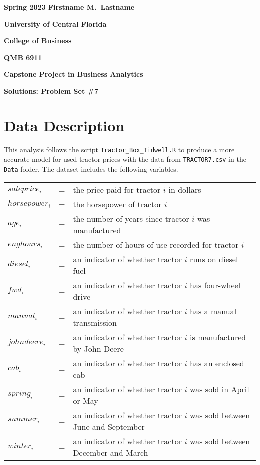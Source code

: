 \documentclass[11pt]{paper}
\begin{document}

\pagestyle{empty}
{\noindent\bf Spring 2023 \hfill Firstname M.~Lastname}
\vskip 16pt
\centerline{\bf University of Central Florida}
\centerline{\bf College of Business}
\vskip 16pt
\centerline{\bf QMB 6911}
\centerline{\bf Capstone Project in Business Analytics}
\vskip 10pt
\centerline{\bf Solutions:  Problem Set \#7}
\vskip 32pt
\noindent
% 
\section{Data Description}

This analysis follows the script \texttt{Tractor\_Box\_Tidwell.R} to produce a more accurate model for used tractor prices with the data from \texttt{TRACTOR7.csv} in the \texttt{Data} folder. 
The dataset includes the following variables.
\begin{table}[h!]
\begin{tabular}{l l l}

$saleprice_i$ & = & the price paid for tractor $i$ in dollars \\
% 
$horsepower_i$ & = & the horsepower of tractor $i$ \\
$age_i$ & = & the number of years since tractor $i$ was manufactured  \\
$enghours_i$ & = & the number of hours of use recorded for tractor $i$  \\
$diesel_i$ & = & an indicator of whether tractor $i$ runs on diesel fuel \\ %
$fwd_i$ & = & an indicator of whether tractor $i$ has four-wheel drive \\ %
$manual_i$ & = & an indicator of whether tractor $i$ has a manual transmission \\ %
$johndeere_i$ & = & an indicator of whether tractor $i$ is manufactured by John Deere \\ %
$cab_i$ & = & an indicator of whether tractor $i$ has an enclosed cab \\ %
% 
$spring_i$ & = & an indicator of whether tractor $i$ was sold in April or May \\ %
$summer_i$ & = & an indicator of whether tractor $i$ was sold between June and September \\ %
$winter_i$ & = & an indicator of whether tractor $i$ was sold between December and March \\ %

\end{tabular}
\end{table}
%
\end{document}
